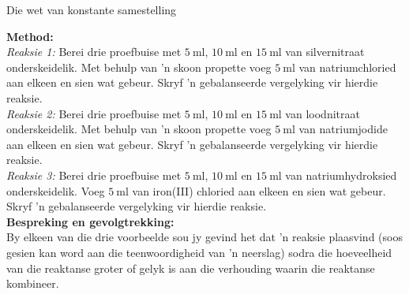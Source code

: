 \begin{Investigation}{Die wet van konstante samestelling}
\begin{minipage}{.6\textwidth}
\begin{center}
{}
 \end{center}
\end{minipage}
\textbf{Method:}\\
\textsl{Reaksie 1:} Berei drie proefbuise met $5~\text{ml}$, $10~\text{ml}$ en $15~\text{ml}$ van silvernitraat onderskeidelik. Met behulp van 'n skoon propette voeg $5~\text{ml}$ van natriumchloried aan elkeen en sien wat gebeur. Skryf 'n gebalanseerde vergelyking vir hierdie reaksie.\\
\textsl{Reaksie 2:} Berei drie proefbuise met $5~\text{ml}$, $10~\text{ml}$ en $15~\text{ml}$  van loodnitraat onderskeidelik. Met behulp van 'n skoon propette voeg $5~\text{ml}$ van natriumjodide aan elkeen en sien wat gebeur. Skryf 'n gebalanseerde vergelyking vir hierdie reaksie.\\
\textsl{Reaksie 3:} Berei drie proefbuise met $5~\text{ml}$, $10~\text{ml}$ en $15~\text{ml}$  van natriumhydroksied onderskeidelik. Voeg $5~\text{ml}$ van iron(III) chloried aan elkeen en sien wat gebeur. Skryf 'n gebalanseerde vergelyking vir hierdie reaksie. \\
\textbf{Bespreking en gevolgtrekking:} \\
By elkeen van die drie voorbeelde sou jy gevind het dat 'n reaksie plaasvind (soos gesien kan word aan die teenwoordigheid van 'n neerslag) sodra die hoeveelheid van die reaktanse groter of gelyk is aan die verhouding waarin die reaktanse kombineer.  
\end{Investigation}

    \label{m38711*cid7}

